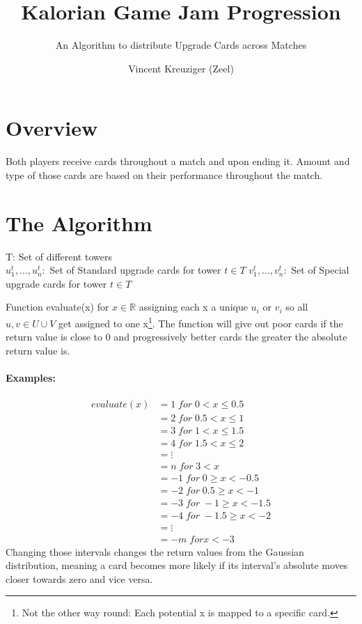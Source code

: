 \documentclass{scrartcl}
\title{Kalorian Game Jam Progression}
\subtitle{An Algorithm to distribute Upgrade Cards across Matches}
\author{Vincent Kreuziger (Zeel)}
\begin{document}
\maketitle
\tableofcontents
\section{Overview}
Both players receive cards throughout a match and upon ending it. Amount and type of those cards are based on their performance throughout the match. 
\section{The Algorithm}
T: Set of different towers\\
$u_1^t, \ldots , u_n^t: $ Set of Standard upgrade cards for tower $t\in T$
$v_1^t, \ldots , v_n^t: $ Set of Special upgrade cards for tower $t\in T$

Function evaluate(x) for $x\in\mathds{R}$ assigning each x a unique $u_i$ or $v_i$ so all $u,v \in U\cup V$ get assigned to one x\footnote{Not the other way round: Each potential x is mapped to a specific card.}. The function will give out poor cards if the return value is close to 0 and progressively better cards the greater the absolute return value is. 
\paragraph{Examples:}
\begin{align*}
evaluate(x) & = 1 \; for\;  0<x\leq 0.5\\
 & = 2 \; for\;  0.5<x\leq 1\\
 & = 3 \; for\;  1<x\leq 1.5\\
 & = 4 \; for\;  1.5<x\leq 2\\
 & = \vdots\\
 & = n \; for\;  3 < x\\
 & = -1 \; for\;  0\geq x < -0.5\\
 & = -2 \; for\;  0.5\geq x < -1\\
 & = -3 \; for\;  -1\geq x < -1.5\\
 & = -4 \; for\;  -1.5\geq x < -2\\
 & = \vdots\\
 & = -m \; for x < -3
\end{align*}
Changing those intervals changes the return values from the Gaussian distribution, meaning a card becomes more likely if its interval's absolute moves closer towards zero and vice versa. 
\label{example}
\end{document}
